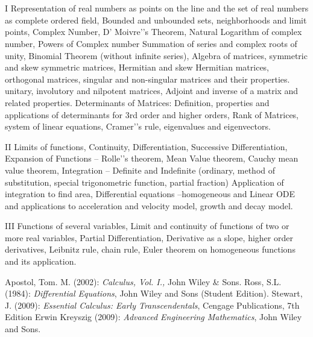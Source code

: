 \section{\courseinfo}
\unit{I}
Representation of real numbers as points on the line and the set of real numbers as complete ordered field, Bounded and unbounded sets, neighborhoods and limit points, Complex Number, D’ Moivre'’s Theorem, Natural Logarithm of complex number, Powers of Complex number Summation of series and complex roots of unity, Binomial Theorem (without infinite series), Algebra of matrices, symmetric and skew symmetric matrices, Hermitian and skew Hermitian matrices, orthogonal matrices, singular and non-singular matrices and their properties. unitary, involutory and nilpotent matrices, Adjoint and inverse of a matrix and related properties. Determinants of Matrices: Definition, properties and applications of determinants for 3rd order  and higher orders, Rank of Matrices, system of linear equations, Cramer'’s rule, eigenvalues and eigenvectors. 

\unit{II}
Limits of functions, Continuity, Differentiation, Successive Differentiation, Expansion of Functions – Rolle'’s theorem, Mean Value theorem, Cauchy mean value theorem, Integration – Definite and Indefinite (ordinary, method of substitution, special trigonometric function, partial fraction) Application of integration to find area, Differential equations --homogeneous and Linear ODE and applications to acceleration and velocity model, growth and decay model. 

\unit{III}
Functions of several variables, Limit and continuity of functions of two or more real variables, Partial Differentiation, Derivative as a slope, higher order derivatives, Leibnitz rule, chain rule, Euler theorem on homogeneous functions and its application.

\begin{thebibliography}{99}
         Apostol, Tom. M. (2002): \emph{Calculus, Vol. I.,} John Wiley \& Sons.  
         Ross, S.L. (1984): \emph{Differential Equations}, John Wiley and Sons (Student Edition). 
         Stewart, J. (2009): \emph{Essential Calculus: Early Transcendentals}, Cengage Publications, 7th Edition
         Erwin Kreyszig (2009): \emph{Advanced Engineering Mathematics}, John Wiley and Sons. 
\end{thebibliography}
